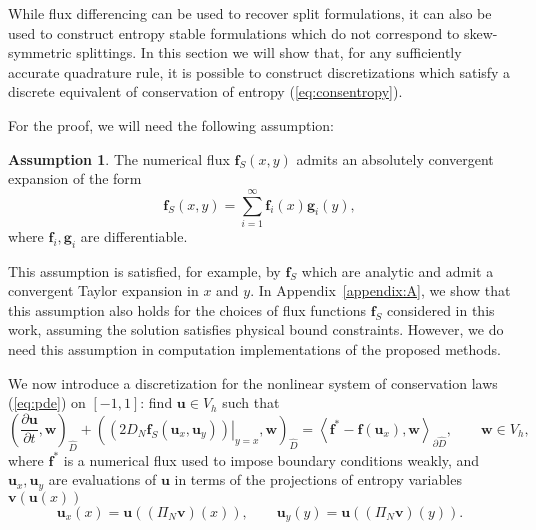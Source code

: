\documentclass[preprint,10pt]{article}
\theoremstyle{definition}
\theoremstyle{lemma}
\theoremstyle{theorem}
\theoremstyle{assumption}
\newtheorem{assumption}{Assumption}
\newcommand{\pd}[2]{\frac{\partial#1}{\partial#2}}
\newcommand{\LRp}[1]{\left( #1 \right)}
\newcommand{\LRa}[1]{\left\langle #1 \right\rangle}
\begin{document}
While flux differencing can be used to recover split formulations, it can also be used to construct entropy stable formulations which do not correspond to skew-symmetric splittings.  In this section we will show that, for any sufficiently accurate quadrature rule, it is possible to construct discretizations which satisfy a discrete equivalent of conservation of entropy (\ref{eq:consentropy}).  

For the proof, we will need the following assumption:
\begin{assumption}
The numerical flux $\bm{f}_S(x,y)$ admits an absolutely convergent expansion of the form
\[
\bm{f}_S(x,y) = \sum_{i=1}^{\infty} \bm{f}_i(x) \bm{g}_i(y), 
\]
where $\bm{f}_i, \bm{g}_i$ are differentiable.  
\label{eq:assumption}
\end{assumption}
This assumption is satisfied, for example, by $\bm{f}_S$ which are analytic and admit a convergent Taylor expansion in $x$ and $y$.  In Appendix~\ref{appendix:A}, we show that this assumption also holds for the choices of flux functions $\bm{f}_S$ considered in this work, assuming the solution satisfies physical bound constraints.  However, we do need this assumption in computation implementations of the proposed methods.  

We now introduce a discretization for the nonlinear system of conservation laws (\ref{eq:pde}) on $[-1,1]$: find $\bm{u}\in V_h$ such that
\begin{equation}
\LRp{\pd{\bm{u}}{t},\bm{w}}_{\widehat{D}} + \LRp{\left.\LRp{2D_N \bm{f}_S(\bm{u}_x,\bm{u}_y)}\right|_{y=x},\bm{w}}_{\widehat{D}}= \LRa{\bm{f}^*-\bm{f}(\bm{u}_x),\bm{w}}_{\partial \widehat{D}}, \qquad \bm{w}\in V_h,
\label{eq:ecdg_oneelem}
\end{equation}
where $\bm{f}^*$ is a numerical flux used to impose boundary conditions weakly, and $\bm{u}_x,\bm{u}_y$ are evaluations of $\bm{u}$ in terms of the projections of entropy variables $\bm{v}(\bm{u}(x))$ 
\begin{equation}
\bm{u}_x(x) = \bm{u}\LRp{(\Pi_N\bm{v})(x)}, \qquad \bm{u}_y(y) = \bm{u}\LRp{(\Pi_N\bm{v})(y)}.
\label{eq:projectedentropyvars}
\end{equation}
\end{document}

